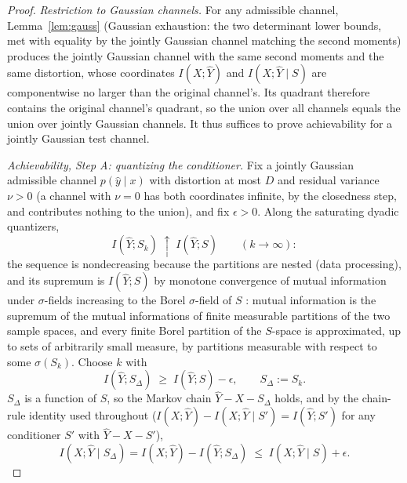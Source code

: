 \documentclass[11pt,onecolumn]{IEEEtran}
\newcommand{\hY}{\widehat{Y}}
\begin{document}
\begin{proof}
\emph{Restriction to Gaussian channels.} For any admissible channel,
Lemma~\ref{lem:gauss} (Gaussian exhaustion: the two determinant lower
bounds, met with equality by the jointly Gaussian channel matching the
second moments) produces the jointly Gaussian channel with the
same second moments and the same distortion, whose coordinates
$I(X;\hY)$ and $I(X;\hY\mid S)$ are componentwise no larger than the
original channel's. Its quadrant therefore
contains the original channel's quadrant, so the union over all
channels equals the union over jointly Gaussian channels. It thus
suffices to prove achievability for a jointly Gaussian test channel.

\emph{Achievability, Step A: quantizing the conditioner.} Fix a jointly
Gaussian admissible channel $p(\hat y\mid x)$ with distortion at most
$D$ and residual variance $\nu>0$ (a channel with $\nu=0$ has both
coordinates infinite, by the closedness step, and contributes nothing
to the union), and fix $\epsilon>0$. Along the saturating dyadic quantizers,
\begin{equation}
I(\hY;S_k)\;\uparrow\;I(\hY;S)\qquad(k\to\infty):
\label{eq:quant-mono}
\end{equation}
the sequence is nondecreasing because the partitions are nested (data
processing), and its supremum is $I(\hY;S)$ by monotone convergence of
mutual information under $\sigma$-fields increasing to the Borel
$\sigma$-field of $S$ \cite[Ch.~2]{pinsker1964}: mutual information is
the supremum of the mutual informations of finite measurable
partitions of the two sample spaces, and every finite Borel partition
of the $S$-space is approximated, up to sets of arbitrarily small
measure, by partitions measurable with respect to some
$\sigma(S_k)$. Choose $k$ with
\begin{equation}
I(\hY;S_\Delta)\;\ge\;I(\hY;S)-\epsilon,
\qquad S_\Delta:=S_k .
\label{eq:quant-approx}
\end{equation}
$S_\Delta$ is a function of $S$, so the Markov chain $\hY-X-S_\Delta$
holds, and by the chain-rule identity used throughout
($I(X;\hY)-I(X;\hY\mid S')=I(\hY;S')$ for any conditioner $S'$ with
$\hY-X-S'$),
\begin{equation}
I(X;\hY\mid S_\Delta)=I(X;\hY)-I(\hY;S_\Delta)
\;\le\;I(X;\hY\mid S)+\epsilon .
\label{eq:quant-chain}
\end{equation}


\end{proof}
\end{document}
